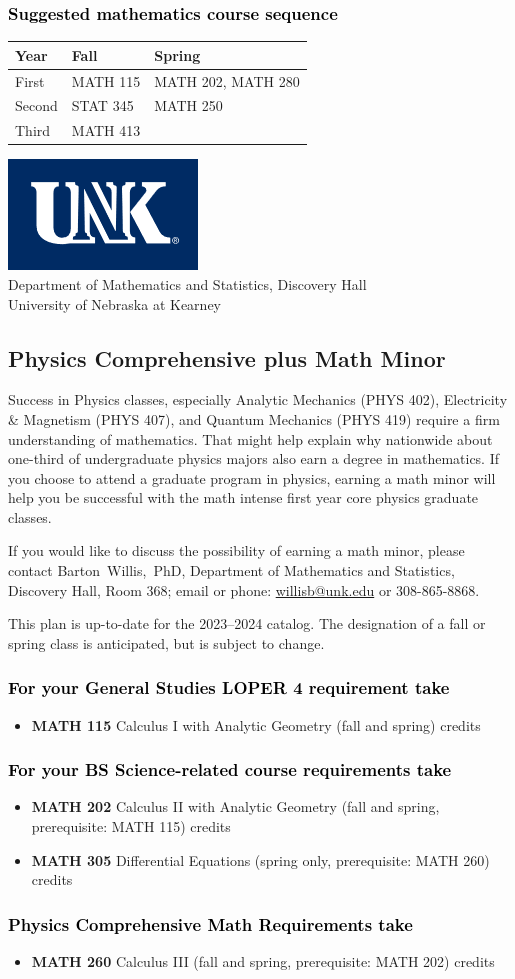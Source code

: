 \documentclass[11pt]{article}
\makeatletter
\newcommand{\calcone}{\textbf{MATH 115} Calculus I with Analytic Geometry (fall and spring) \dotfill 5 credits}
\newcommand{\calconeshort}{MATH 115}
\newcommand{\calctwo}{\textbf{MATH 202} Calculus II with Analytic Geometry (fall and spring, prerequisite: MATH 115) \dotfill 5 credits }
\newcommand{\calctwoshort}{MATH 202}
\newcommand{\foundationsshort}{MATH 250}
\newcommand{\calcthree}{\textbf{MATH 260} Calculus III  (fall and spring, prerequisite: MATH 202) \dotfill 5 credits}
\newcommand{\linearshort}{MATH 280}
\newcommand{\discreteshort}{MATH 413}
\newcommand{\diffeq}{\textbf{MATH 305}	Differential Equations (spring only, prerequisite: MATH 260) \dotfill 	3 credits}
\newcommand{\appliedstatshort}{STAT 345}
\newcommand{\contactbw}{\mbox{Barton Willis, PhD}, Department of Mathematics and Statistics,  Discovery Hall, Room 368;
email or phone: \href{mailto:willisb@unk.edu}{willisb@unk.edu} or 308-865-8868.}
\newcommand{\forinfo}[2]{If you would like to discuss the possibility of earning a math {#1}, please contact \contactbw}
\newcommand{\catalog}{2023--2024 }
\newcommand{\LOPER}{LOPER\xspace}
\newcommand{\uptodate}{This plan is up-to-date for  the \catalog catalog. The designation of a fall or spring class is 
anticipated, but  is subject to change.}
\newcommand{\myheading}{
\begin{flushleft}
\includegraphics[scale=0.35]{unk-logo}\\
\setcounter{footnote}{0}
\vspace{0.25in}
 \textcolor{unkblue}{Department of Mathematics and Statistics, Discovery Hall} \\
  \textcolor{unkblue}{University of Nebraska at Kearney}
\end{flushleft}}
\newcommand{\mathminor}{
  \begin{center}
   \begin{tabular}[h]{| l | l | l|} 
      \hline
      \textbf{Year} & \textbf{Fall}         &  \textbf{Spring}  \\ \hline 
      First & \calconeshort & \calctwoshort, \linearshort \\  \hline
      Second &  \appliedstatshort{} &  \foundationsshort \\ \hline
      Third &    \discreteshort              &  \\ \hline
      \end{tabular}
      \end{center}}
\makeatother
\begin{document}
\subsubsection*{\textcolor{black}{Suggested mathematics course sequence}}

\mathminor




\newpage

\myheading


\subsection*{\textbf{\textcolor{unkblue}{Physics Comprehensive plus Math Minor}}}

\noindent Success in Physics classes, especially  Analytic Mechanics (PHYS 402), Electricity \& Magnetism (PHYS 407), and Quantum Mechanics (PHYS 419) require a 
firm understanding of mathematics. That might help explain why 
nationwide about one-third of undergraduate physics majors also 
earn a degree in mathematics. If you choose to attend a graduate 
program in physics, earning a math minor will help you be successful 
with the math intense first year core physics graduate classes.


\forinfo{minor}{Physics Comprehensive}

\uptodate

\subsubsection*{\textcolor{black}{For your General Studies \LOPER 4 requirement take}}
\begin{itemize}
\item \calcone
\end{itemize}

\subsubsection*{\textcolor{black}{For your BS Science-related course requirements take}}
\begin{itemize}
\item \calctwo
\item \diffeq
\end{itemize}


\subsubsection*{\textcolor{black}{Physics Comprehensive Math Requirements take}}
\begin{itemize}
 \item \calcthree
\end{itemize}
\end{document}
